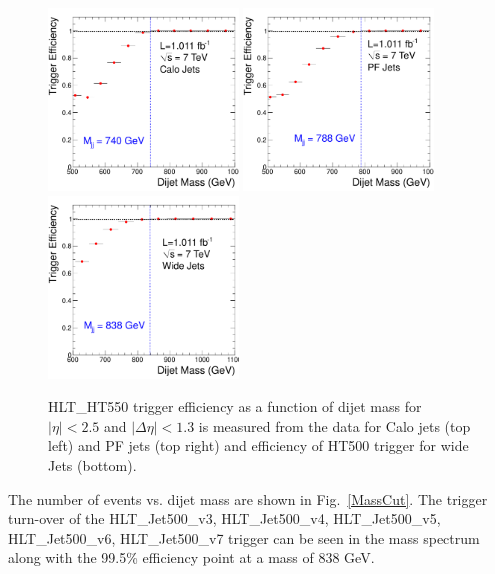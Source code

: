 \begin{figure}[!ht]
  \begin{center}
    \includegraphics[width=0.45\textwidth]{Figures/trigger_efficiency_1.pdf}
    \includegraphics[width=0.45\textwidth]{Figures/trigger_efficiency_2.pdf}
    \includegraphics[width=0.45\textwidth]{Figures/trigger_efficiency_3.pdf}
    \caption{ HLT\_HT550 trigger efficiency as a function of dijet mass for 
    $|\eta|<2.5$ and $|\Delta\eta|<1.3$ is measured from the data for Calo jets (top left)
      and PF jets (top right) and efficiency of HT500 trigger for wide Jets (bottom).}
    \label{Trigger}
  \end{center}
\end{figure}

The number of events vs. dijet mass are shown in Fig.~\ref{MassCut}.
The trigger turn-over of the HLT\_Jet500\_v3, HLT\_Jet500\_v4, HLT\_Jet500\_v5,
HLT\_Jet500\_v6, HLT\_Jet500\_v7 trigger can be seen in the mass spectrum
along with the 99.5\% efficiency point at a mass of 838 GeV.

